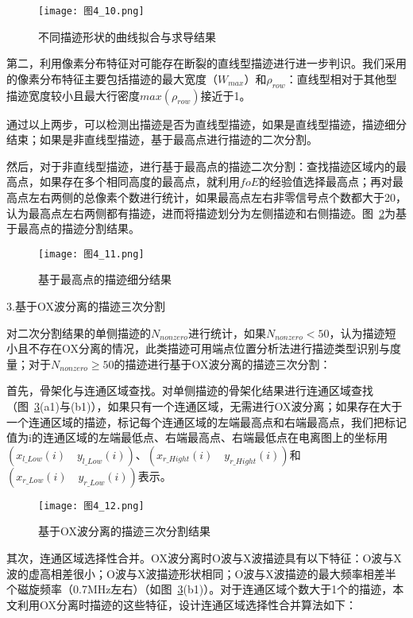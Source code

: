 \begin{figure}[!ht]
\centering
\texttt{[image: 图4\_10.png]}
\caption{不同描迹形状的曲线拟合与求导结果}
\label{图4_10}
\end{figure}

 
第二，利用像素分布特征对可能存在断裂的直线型描迹进行进一步判识。我们采用的像素分布特征主要包括描迹的最大宽度（$W_{max}$）和$\rho_{row}$：直线型相对于其他型描迹宽度较小且最大行密度$max(\rho_{row})$接近于1。

通过以上两步，可以检测出描迹是否为直线型描迹，如果是直线型描迹，描迹细分结束；如果是非直线型描迹，基于最高点进行描迹的二次分割。

然后，对于非直线型描迹，进行基于最高点的描迹二次分割：查找描迹区域内的最高点，如果存在多个相同高度的最高点，就利用$foE$的经验值选择最高点；再对最高点左右两侧的总像素个数进行统计，如果最高点左右非零信号点个数都大于20，认为最高点左右两侧都有描迹，进而将描迹划分为左侧描迹和右侧描迹。图~\ref{图4_11}为基于最高点的描迹分割结果。

\begin{figure}[!ht]
\centering
\texttt{[image: 图4\_11.png]}
\caption{基于最高点的描迹细分结果}
\label{图4_11}
\end{figure}

3.基于OX波分离的描迹三次分割

对二次分割结果的单侧描迹的$N_{nonzero}$进行统计，如果$N_{nonzero}<50$，认为描迹短小且不存在OX分离的情况，此类描迹可用端点位置分析法进行描迹类型识别与度量；对于$N_{nonzero}\geq 50$的描迹进行基于OX波分离的描迹三次分割：

首先，骨架化与连通区域查找。对单侧描迹的骨架化结果进行连通区域查找（图~\ref{图4_12}(a1)与(b1)），如果只有一个连通区域，无需进行OX波分离；如果存在大于一个连通区域的描迹，标记每个连通区域的左端最高点和右端最高点，我们把标记值为i的连通区域的左端最低点、右端最高点、右端最低点在电离图上的坐标用$(x_{l\_Low} (i) \quad y_{l\_Low} (i))$、$(x_{r\_Hight} (i) \quad y_{r\_Hight} (i) )$和$(x_{r\_Low} (i) \quad y_{r\_Low} (i) )$表示。

\begin{figure}[h]
\centering
\texttt{[image: 图4\_12.png]}
\caption{基于OX波分离的描迹三次分割结果}
\label{图4_12}
\end{figure}

其次，连通区域选择性合并。OX波分离时O波与X波描迹具有以下特征：O波与X波的虚高相差很小；O波与X波描迹形状相同；O波与X波描迹的最大频率相差半个磁旋频率（0.7MHz左右）（如图~\ref{图4_12}(b1)）。对于连通区域个数大于1个的描迹，本文利用OX分离时描迹的这些特征，设计连通区域选择性合并算法如下：
 
